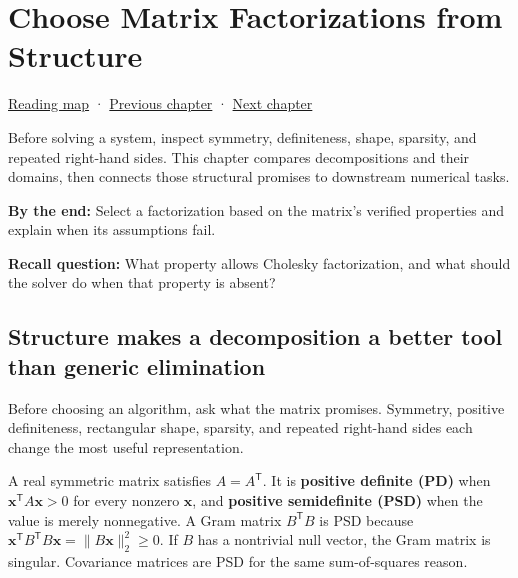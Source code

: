 \chapter{Choose Matrix Factorizations from Structure}\label{01-foundations-i-ch020-choose-matrix-factorizations-from-structure}\hypertarget{01-foundations-i-ch020}{}\label{stagechapter:01-foundations-i-ch020}

\hypertarget{01-foundations-i-ch020-choose-matrix-factorizations-from-structure}{}

\hyperref[volume-reading-map]{Reading map} · \hyperref[01-foundations-i-ch019-coordinate-frames-and-linear-systems]{Previous chapter} · \hyperref[02-foundations-ii-ch021-multivariable-derivatives-and-sensitivity]{Next chapter}

Before solving a system, inspect symmetry, definiteness, shape, sparsity, and repeated right-hand sides. This chapter compares decompositions and their domains, then connects those structural promises to downstream numerical tasks.

\textbf{By the end:} Select a factorization based on the matrix's verified properties and explain when its assumptions fail.

\textbf{Recall question:} What property allows Cholesky factorization, and what should the solver do when that property is absent?

\section{Structure makes a decomposition a better tool than generic elimination}\label{01-foundations-i-ch020-structure-makes-a-decomposition-a-better-tool-than-generic-elimination}

\hypertarget{01-foundations-i-ch020-structure-makes-a-decomposition-a-better-tool-than-generic-elimination}{}

Before choosing an algorithm, ask what the matrix promises. Symmetry, positive definiteness, rectangular shape, sparsity, and repeated right-hand sides each change the most useful representation.

A real symmetric matrix satisfies \(A=A^\mathsf T\). It is \textbf{positive definite (PD)} when \(\mathbf x^\mathsf T A\mathbf x>0\) for every nonzero \(\mathbf x\), and \textbf{positive semidefinite (PSD)} when the value is merely nonnegative. A Gram matrix \(B^\mathsf T B\) is PSD because \(\mathbf x^\mathsf T B^\mathsf T B\mathbf x=\|B\mathbf x\|_2^2\ge0\). If \(B\) has a nontrivial null vector, the Gram matrix is singular. Covariance matrices are PSD for the same sum-of-squares reason.

